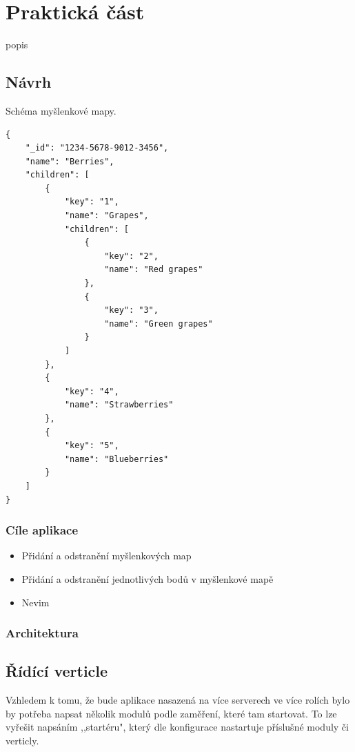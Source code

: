 
\chapter{Praktická část}

popis

\section{Návrh}

Schéma myšlenkové mapy.

\begin{lstlisting}
{
	"_id": "1234-5678-9012-3456",
	"name": "Berries",
	"children": [
		{
			"key": "1",
			"name": "Grapes",
			"children": [
				{
					"key": "2",
					"name": "Red grapes"
				},
				{
					"key": "3",
					"name": "Green grapes"
				}
			]
		},
		{
			"key": "4",
			"name": "Strawberries"
		},
		{
			"key": "5",
			"name": "Blueberries"
		}
	]
}

\end{lstlisting}

\subsection{Cíle aplikace}

\begin{itemize}
\item Přidání a odstranění myšlenkových map
\item Přidání a odstranění jednotlivých bodů v myšlenkové mapě
\item Nevim
\end{itemize}

\subsection{Architektura}



\section{Řídící verticle}

Vzhledem k tomu, že bude aplikace nasazená na více serverech ve více rolích bylo by potřeba napsat několik modulů podle zaměření, které tam startovat. To lze vyřešit napsáním ,,startéru", který dle konfigurace nastartuje příslušné moduly či verticly.

